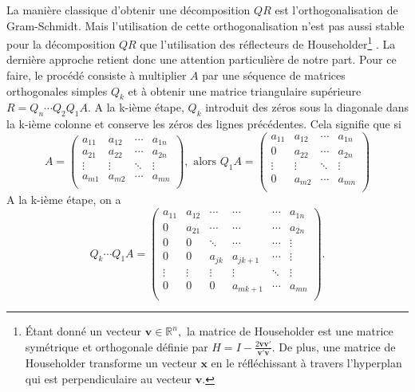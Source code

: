 \documentclass[11pt,a4paper,oneside]{book}
\def\R{\mathbb R}
\def\v{\mathbf v}
\def\x{\mathbf x}
\newcommand{\pf}[2]{\frac{#1}{#2}}
\begin{document}
La manière classique d'obtenir une décomposition $ QR $ est l'orthogonalisation de Gram-Schmidt. Mais l'utilisation de cette orthogonalisation n'est pas aussi stable pour la décomposition $ QR $ que l'utilisation des réflecteurs de Householder\footnote{Étant donné un vecteur $ \v \in\R^{n},$ la matrice de Householder est une matrice symétrique et orthogonale définie par $ H=I-\pf{2\v\v'}{\v'\v} $. De plus, une matrice de Householder transforme un vecteur $ \x $  en le réfléchissant à travers l'hyperplan qui est perpendiculaire au vecteur $ \v $. } \cite[p.13]{BalbineAIMS}.  La dernière approche  retient donc une attention particulière de notre part. Pour ce faire, le procédé consiste à multiplier $ A $ par une séquence de matrices orthogonales simples $ Q_{k} $ et à obtenir une matrice triangulaire supérieure $ R=Q_{n}\cdots Q_{2}Q_{1}A $. A la k-ième étape, $ Q_{k} $ introduit des zéros sous la diagonale dans la k-ième colonne et conserve les zéros des lignes précédentes. Cela signifie que si
\begin{equation*}
A=\begin{pmatrix}
a_{11}&a_{12}&\cdots&a_{1n}\\
a_{21}&a_{22}&\cdots&a_{2n}\\
\vdots&\vdots&\ddots&\vdots\\
a_{m1}&a_{m2}&\cdots&a_{mn}\\
\end{pmatrix},\text{ alors } Q_{1}A=\begin{pmatrix}
a_{11}&a_{12}&\cdots&a_{1n}\\
0&a_{22}&\cdots&a_{2n}\\
\vdots&\vdots&\ddots&\vdots\\
0&a_{m2}&\cdots&a_{mn}\\
\end{pmatrix}
\end{equation*}
A la k-ième étape, on a 
\begin{equation*}
Q_{k}\cdots Q_{1}A=\begin{pmatrix}
a_{11}&a_{12}&\cdots&\cdots&\cdots&a_{1n}\\
0&a_{21}&\cdots&\cdots&\cdots&a_{2n}\\
0&0&\ddots&\cdots&\cdots&\vdots\\
0&0&a_{jk}&a_{jk+1}&\cdots&\vdots\\
\vdots&\vdots&\vdots&\vdots&\ddots&\vdots\\
0&0&0&a_{mk+1}&\cdots&a_{mn}\\
\end{pmatrix}.
\end{equation*}
\end{document}
